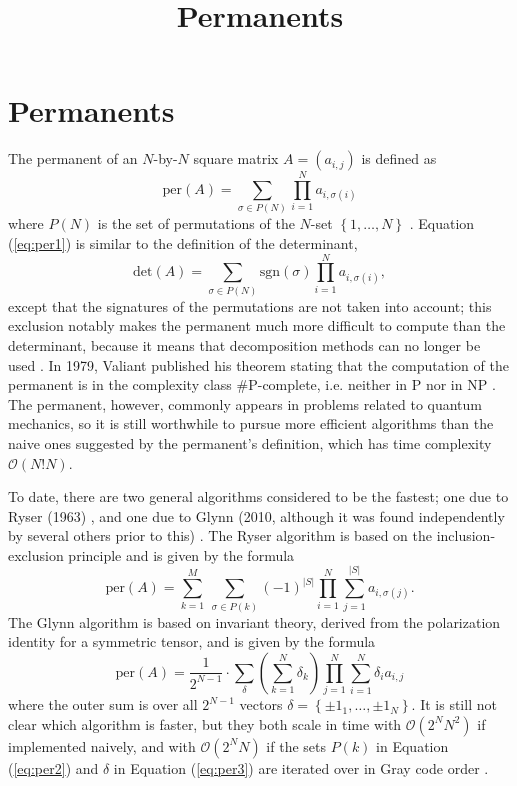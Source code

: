 \documentclass{article}
\title{Permanents}
\begin{document}
\section*{Permanents}

The permanent of an $N$-by-$N$ square matrix $A = \left(a_{i,j}\right)$ is defined as
\begin{equation} \label{eq:per1}
    \text{per}(A) = \sum_{\sigma \in P(N)}{\prod_{i=1}^N{a_{i,{\sigma(i)}}}}
\end{equation}
where $P(N)$ is the set of permutations of the $N$-set $\left\{1,\dots,N\right\}$
\cite{wiki:permanent}. Equation (\ref{eq:per1}) is similar to the definition of the determinant,
\begin{equation} \label{eq:det1}
    \text{det}(A) = \sum_{\sigma \in P(N)}{\text{sgn}(\sigma) \prod_{i=1}^N{a_{i,{\sigma(i)}}}},
\end{equation}
except that the signatures of the permutations are not taken into account; this exclusion notably
makes the permanent much more difficult to compute than the determinant, because it means that
decomposition methods can no longer be used \cite{wiki:computing}. In 1979, Valiant published his
theorem stating that the computation of the permanent is in the complexity class \#P-complete, i.e.
neither in P nor in NP \cite{valiant1979}. The permanent, however, commonly appears in problems
related to quantum mechanics, so it is still worthwhile to pursue more efficient algorithms than the
naive ones suggested by the permanent's definition, which has time complexity $\mathcal{O}(N!N)$.

To date, there are two general algorithms considered to be the fastest; one due to Ryser (1963)
\cite{ryser1963}, and one due to Glynn (2010, although it was found independently by several others
prior to this) \cite{wiki:computing,glynn2010}. The Ryser algorithm is based on the
inclusion-exclusion principle and is given by the formula
\begin{equation} \label{eq:per2}
    \text{per}(A) = \sum_{k=1}^M{
        ~\sum_{\sigma \in P(k)}{
            {\left(-1\right)}^{\left|S\right|} \prod_{i=1}^N{\sum_{j=1}^{\left|S\right|}{a_{i,{\sigma(j)}}}}
        }
    }.
\end{equation}
The Glynn algorithm is based on invariant theory, derived from the polarization identity for
a symmetric tensor, and is given by the formula
\begin{equation} \label{eq:per3}
    \text{per}(A) = \frac{1}{2^{N-1}} \cdot \sum_{\delta}{
        \left(\sum_{k=1}^N{\delta_k}\right)
        \prod_{j=1}^N{\sum_{i=1}^N{\delta_i a_{i,j}}}
    }
\end{equation}
where the outer sum is over all $2^{N-1}$ vectors $\delta = \left\{\pm 1_1,\dots,\pm 1_N\right\}$.
It is still not clear which algorithm is faster, but they both scale in time with $\mathcal{O}(2^N
N^2)$ if implemented naively, and with $\mathcal{O}(2^N N)$ if the sets $P(k)$ in Equation
(\ref{eq:per2}) and $\delta$ in Equation (\ref{eq:per3}) are iterated over in Gray code order
\cite{wiki:computing,knuth2005}.
\end{document}

